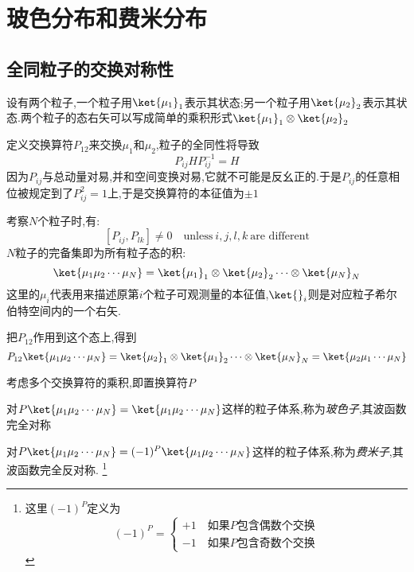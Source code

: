 
\section{玻色分布和费米分布}

\subsection{全同粒子的交换对称性}
    设有两个粒子,一个粒子用$\ket{\mu_1}_1$表示其状态;另一个粒子用$\ket{\mu_2}_2$表示其状态.两个粒子的态右矢可以写成简单的乘积形式$\ket{\mu_1}_1 \otimes \ket{\mu_2}_2$

    定义交换算符$P_{12}$来交换$\mu_1$和$\mu_2$,粒子的全同性将导致
    \[P_{ij} H P_{ij}^{-1}=H\]
    因为$P_{ij}$与总动量对易,并和空间变换对易,它就不可能是反幺正的.于是$P_{ij}$的任意相位被规定到了$P_{ij}^{2}=1$上,于是交换算符的本征值为$\pm 1$

    考察$N$个粒子时,有:
    \[[P_{ij},P_{lk}]\neq 0 \quad \text{unless} ~i,j,l,k ~\text{are different}\]
    $N$粒子的完备集即为所有粒子态的积:
    \begin{equation}
      \ket{\mu_{1}\mu_2\cdots\mu_N}=\ket{\mu_1}_1 \otimes \ket{\mu_2}_2 \cdots \otimes \ket{\mu_N}_N
    \end{equation}
    这里的$\mu_i$代表用来描述原第$i$个粒子可观测量的本征值,$\ket{ }_i$则是对应粒子希尔伯特空间内的一个右矢.

    把$P_{12}$作用到这个态上,得到
    \begin{equation}
      P_{12}\ket{\mu_1\mu_2\cdots\mu_N}=\ket{\mu_2}_1 \otimes \ket{\mu_1}_2 \cdots\otimes \ket{\mu_N}_N=\ket{\mu_2 \mu_1 \cdots \mu_N}
    \end{equation}
    
    \vspace*{0.5cm
    }
    考虑多个交换算符的乘积,即置换算符$P$

    对$P\ket{\mu_1 \mu_2 \cdots \mu_N}=\ket{\mu_1 \mu_2 \cdots \mu_N}$这样的粒子体系,称为\emph{玻色子},其波函数完全对称

    对$P\ket{\mu_1 \mu_2 \cdots \mu_N}=(-1)^{P} \ket{\mu_1 \mu_2 \cdots \mu_N}$这样的粒子体系,称为\emph{费米子},其波函数完全反对称.
    \footnote{这里$(-1)^{P}$定义为
    \begin{equation}
      (-1)^{P}=\left\{ 
        \begin{aligned}
         +1\quad\text{如果$P$包含偶数个交换}\\
         -1\quad\text{如果$P$包含奇数个交换} 
        \end{aligned}
      \right.
    \end{equation}
    }
    
